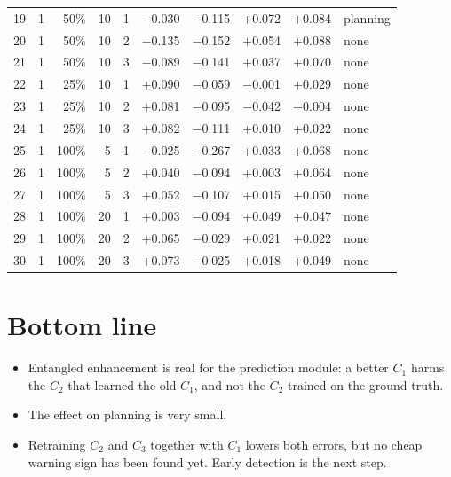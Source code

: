 \documentclass[10pt,a4paper]{article}
\newcommand{\Y}{\cellcolor{red!15}}
\begin{document}
\begin{tabular}{rcrrcrrrrl}
19 & 1 & 50\% & 10 & 1 & $-$0.030 & $-$0.115 & \Y +0.072 & \Y +0.084 & planning\\
20 & 1 & 50\% & 10 & 2 & $-$0.135 & $-$0.152 & \Y +0.054 & \Y +0.088 & none\\
21 & 1 & 50\% & 10 & 3 & $-$0.089 & $-$0.141 & \Y +0.037 & \Y +0.070 & none\\
22 & 1 & 25\% & 10 & 1 & +0.090 & $-$0.059 & $-$0.001 & \Y +0.029 & none\\
23 & 1 & 25\% & 10 & 2 & +0.081 & $-$0.095 & $-$0.042 & $-$0.004 & none\\
24 & 1 & 25\% & 10 & 3 & +0.082 & $-$0.111 & +0.010 & \Y +0.022 & none\\
25 & 1 & 100\% & 5 & 1 & $-$0.025 & $-$0.267 & \Y +0.033 & \Y +0.068 & none\\
26 & 1 & 100\% & 5 & 2 & +0.040 & $-$0.094 & +0.003 & \Y +0.064 & none\\
27 & 1 & 100\% & 5 & 3 & +0.052 & $-$0.107 & +0.015 & \Y +0.050 & none\\
28 & 1 & 100\% & 20 & 1 & +0.003 & $-$0.094 & \Y +0.049 & \Y +0.047 & none\\
29 & 1 & 100\% & 20 & 2 & +0.065 & $-$0.029 & \Y +0.021 & \Y +0.022 & none\\
30 & 1 & 100\% & 20 & 3 & +0.073 & $-$0.025 & +0.018 & \Y +0.049 & none\\
\bottomrule\end{tabular}

\section*{Bottom line}
\begin{itemize}\setlength{\itemsep}{1pt}
\item Entangled enhancement is real for the prediction module: a better $C_1$ harms the $C_2$ that learned the old $C_1$, and not the $C_2$ trained on the ground truth.
\item The effect on planning is very small.
\item Retraining $C_2$ and $C_3$ together with $C_1$ lowers both errors, but no cheap warning sign has been found yet. Early detection is the next step.
\end{itemize}
\end{document}
